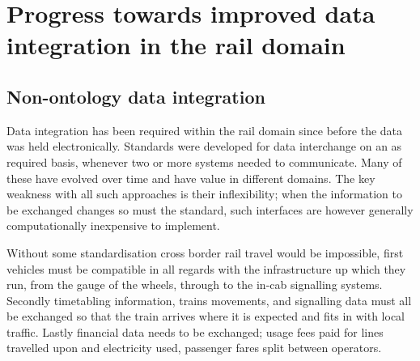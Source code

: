 \section{Progress towards improved data integration in the rail domain}

\subsection{Non-ontology data integration}
Data integration has been required within the rail domain since before the data was held electronically. Standards were developed for data interchange on an as required basis, whenever two or more systems needed to communicate. Many of these have evolved over time and have value in different domains. The key weakness with all such approaches is their inflexibility; when the information to be exchanged changes so must the standard, such interfaces are however generally computationally inexpensive to implement. 

Without some standardisation cross border rail travel would be impossible, first vehicles must be compatible in all regards with the infrastructure up which they run, from the gauge of the wheels, through to the in-cab signalling systems. Secondly timetabling information, trains movements, and signalling data must all be exchanged so that the train arrives where it is expected and fits in with local traffic. Lastly financial data needs to be exchanged; usage fees paid for lines travelled upon and electricity used, passenger fares split between operators.

